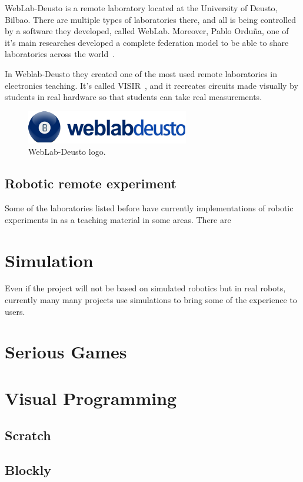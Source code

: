 WebLab-Deusto is a remote laboratory located at the University of Deusto, Bilbao. There are multiple
types of laboratories there, and all is being controlled by a software they developed, called
WebLab. Moreover, Pablo Orduña, one of it's main researches developed a complete federation model
to be able to share laboratories across the world~\cite{porduna_phd}.


In Weblab-Deusto they created one of the most used remote laboratories in electronics teaching. It's
called VISIR~\cite{visir}, and it recreates circuits made visually by students in real hardware so
that students can take real measurements.

\begin{figure}[h]
	\centering
	\includegraphics[width=.4\textwidth]{fig/weblab}
	\caption{WebLab-Deusto logo.}
\end{figure}

\subsection{Robotic remote experiment}

Some of the laboratories listed before have currently implementations of robotic experiments in
as a teaching material in some areas. There are


\section{Simulation}

Even if the project will not be based on simulated robotics but in real robots, currently many
many projects use simulations to bring some of the experience to users.

\section{Serious Games}

\section{Visual Programming}

\subsection{Scratch}

\subsection{Blockly}
